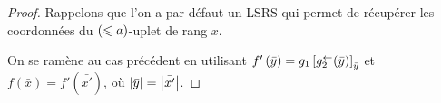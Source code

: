 \begin{proof}
		Rappelons que l'on a par défaut un LSRS qui permet de récupérer les coordonnées du $\left( \leqslant a \right)$-uplet de rang $x$.
		
		
		
		
		On se ramène au cas précédent en utilisant $f'\left( \bar{y} \right) = g_1\left[ g_2^{\leftarrow}(\bar{y}) \right]_{\bar{y}}$ et $f\left( \bar{x} \right) = f'\left( \bar{x'} \right)$, où $\left|\bar{y}\right| = \left|\bar{x'}\right|$.
		
	\end{proof}
	
	
	
	
	
	
	
	
	
	
	
	
	
	
%	
%	
%	
%

















